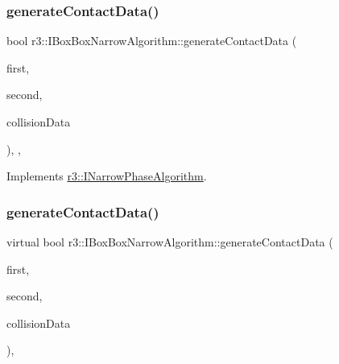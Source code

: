 \subsubsection{\texorpdfstring{generate\+Contact\+Data()}{generateContactData()}\hspace{0.1cm}{\footnotesize\ttfamily [1/2]}}
{\footnotesize\ttfamily bool r3\+::\+I\+Box\+Box\+Narrow\+Algorithm\+::generate\+Contact\+Data (\begin{DoxyParamCaption}\item[{\mbox{\hyperlink{classr3_1_1_collision_primitive}{Collision\+Primitive}} $\ast$}]{first,  }\item[{\mbox{\hyperlink{classr3_1_1_collision_primitive}{Collision\+Primitive}} $\ast$}]{second,  }\item[{\mbox{\hyperlink{classr3_1_1_collision_data}{Collision\+Data}} \&}]{collision\+Data }\end{DoxyParamCaption})\hspace{0.3cm}{\ttfamily [final]}, {\ttfamily [override]}, {\ttfamily [virtual]}}



Implements \mbox{\hyperlink{classr3_1_1_i_narrow_phase_algorithm_a082aa21f5c0ef92acf0d214d9357ec41}{r3\+::\+I\+Narrow\+Phase\+Algorithm}}.

\mbox{\label{classr3_1_1_i_box_box_narrow_algorithm_a21de193b3a23825d9343780a1b771ec2}} 
\subsubsection{\texorpdfstring{generate\+Contact\+Data()}{generateContactData()}\hspace{0.1cm}{\footnotesize\ttfamily [2/2]}}
{\footnotesize\ttfamily virtual bool r3\+::\+I\+Box\+Box\+Narrow\+Algorithm\+::generate\+Contact\+Data (\begin{DoxyParamCaption}\item[{\mbox{\hyperlink{classr3_1_1_collision_box}{Collision\+Box}} $\ast$}]{first,  }\item[{\mbox{\hyperlink{classr3_1_1_collision_box}{Collision\+Box}} $\ast$}]{second,  }\item[{\mbox{\hyperlink{classr3_1_1_collision_data}{Collision\+Data}} \&}]{collision\+Data }\end{DoxyParamCaption})\hspace{0.3cm}{\ttfamily [protected]}, {}}



